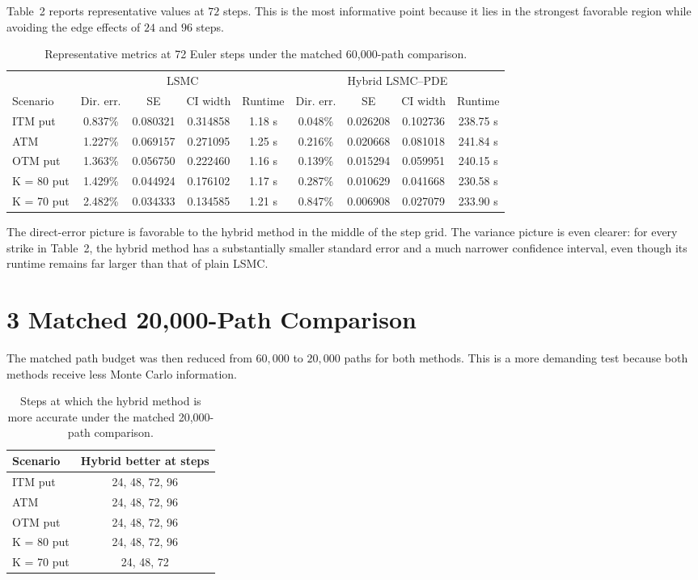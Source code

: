 \documentclass[11pt,a4paper]{article}
\begin{document}
Table~2 reports representative values at \(72\) steps. This is the most informative point because it lies in the strongest favorable region while avoiding the edge effects of \(24\) and \(96\) steps.

\begin{table}[p]
\centering
\caption{Representative metrics at 72 Euler steps under the matched 60,000-path comparison.}
\begin{tabular}{lcccccccc}
\toprule
& \multicolumn{4}{c}{LSMC} & \multicolumn{4}{c}{Hybrid LSMC--PDE} \\
\cmidrule(lr){2-5}\cmidrule(lr){6-9}
Scenario & Dir. err. & SE & CI width & Runtime & Dir. err. & SE & CI width & Runtime \\
\midrule
ITM put & 0.837\% & 0.080321 & 0.314858 & 1.18 s & 0.048\% & 0.026208 & 0.102736 & 238.75 s \\
ATM & 1.227\% & 0.069157 & 0.271095 & 1.25 s & 0.216\% & 0.020668 & 0.081018 & 241.84 s \\
OTM put & 1.363\% & 0.056750 & 0.222460 & 1.16 s & 0.139\% & 0.015294 & 0.059951 & 240.15 s \\
K = 80 put & 1.429\% & 0.044924 & 0.176102 & 1.17 s & 0.287\% & 0.010629 & 0.041668 & 230.58 s \\
K = 70 put & 2.482\% & 0.034333 & 0.134585 & 1.21 s & 0.847\% & 0.006908 & 0.027079 & 233.90 s \\
\bottomrule
\end{tabular}
\end{table}

The direct-error picture is favorable to the hybrid method in the middle of the step grid. The variance picture is even clearer: for every strike in Table~2, the hybrid method has a substantially smaller standard error and a much narrower confidence interval, even though its runtime remains far larger than that of plain LSMC.

\section*{3 \quad Matched 20,000-Path Comparison}

The matched path budget was then reduced from \(60{,}000\) to \(20{,}000\) paths for both methods. This is a more demanding test because both methods receive less Monte Carlo information.

\begin{table}[h!]
\centering
\caption{Steps at which the hybrid method is more accurate under the matched 20,000-path comparison.}
\begin{tabular}{lc}
\toprule
Scenario & Hybrid better at steps \\
\midrule
ITM put & 24, 48, 72, 96 \\
ATM & 24, 48, 72, 96 \\
OTM put & 24, 48, 72, 96 \\
K = 80 put & 24, 48, 72, 96 \\
K = 70 put & 24, 48, 72 \\
\bottomrule
\end{tabular}
\end{table}
\end{document}
